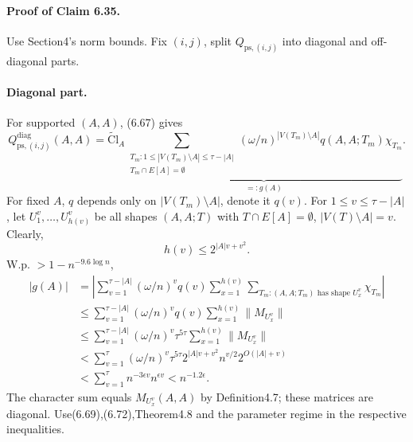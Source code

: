 \documentclass[10pt,a4paper]{article}
\begin{document}
\paragraph{Proof of Claim 6.35.} Use Section4's norm bounds. Fix $(i,j)$, split $Q_{\mathrm{ps},(i,j)}$ into diagonal and off-diagonal parts.
\paragraph{Diagonal part.} For supported $(A,A)$, (6.67) gives
\[Q_{\mathrm{ps},(i,j)}^{\mathrm{diag}}(A,A)=\widetilde{\mathrm{Cl}}_A\underbrace{\sum_{\substack{T_m:1\le|V(T_m)\setminus A|\le\tau-|A|\\T_m\cap E[A]=\emptyset}}(\omega/n)^{|V(T_m)\setminus A|}q(A,A;T_m)\chi_{T_m}}_{=:g(A)}.\]
For fixed $A$, $q$ depends only on $|V(T_m)\setminus A|$, denote it $q(v)$. For $1\le v\le\tau-|A|$, let $U_1^v,\ldots,U_{h(v)}^v$ be all shapes $(A,A;T)$ with $T\cap E[A]=\emptyset$, $|V(T)\setminus A|=v$. Clearly,
\[h(v)\le2^{|A|v+v^2}.\tag{6.72}\]
W.p. $>1-n^{-9.6\log n}$,
\begin{align*}|g(A)|&=\left|\sum_{v=1}^{\tau-|A|}(\omega/n)^vq(v)\sum_{x=1}^{h(v)}\sum_{T_m:(A,A;T_m)\text{ has shape }U_x^v}\chi_{T_m}\right|\\&\le\sum_{v=1}^{\tau-|A|}(\omega/n)^vq(v)\sum_{x=1}^{h(v)}\|M_{U_x^v}\|\\&\le\sum_{v=1}^{\tau-|A|}(\omega/n)^v\tau^{5\tau}\sum_{x=1}^{h(v)}\|M_{U_x^v}\|\\&<\sum_{v=1}^{\tau}(\omega/n)^v\tau^{5\tau}2^{|A|v+v^2}n^{v/2}2^{O(|A|+v)}\\&<\sum_{v=1}^{\tau}n^{-3\epsilon v}n^{\epsilon v}<n^{-1.2\epsilon}.\end{align*}
The character sum equals $M_{U_x^v}(A,A)$ by Definition4.7; these matrices are diagonal. Use(6.69),(6.72),Theorem4.8 and the parameter regime in the respective inequalities.
\end{document}
